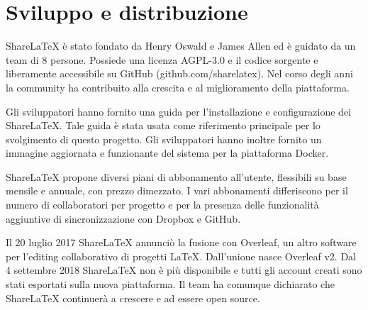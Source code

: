 \section{Sviluppo e distribuzione}
ShareLaTeX è stato fondato da Henry Oswald e James Allen ed è guidato da un team di 8 persone. Possiede una licenza AGPL-3.0 e il codice sorgente e liberamente accessibile su GitHub (github.com/sharelatex). Nel corso degli anni la community ha contribuito alla crescita e al miglioramento della piattaforma.

Gli sviluppatori hanno fornito una guida per l'installazione e configurazione dei ShareLaTeX. Tale guida è stata usata come riferimento principale per lo svolgimento di questo progetto. Gli sviluppatori hanno inoltre fornito un immagine aggiornata e funzionante del sistema per la piattaforma Docker.

ShareLaTeX propone diversi piani di abbonamento all'utente, flessibili su base mensile e annuale, con prezzo dimezzato. I vari abbonamenti differiscono per il numero di collaboratori per progetto e per la presenza delle funzionalità aggiuntive di sincronizzazione con Dropbox e GitHub.

Il 20 luglio 2017 ShareLaTeX annunciò la fusione con Overleaf, un altro software per l'editing collaborativo di progetti LaTeX. Dall'unione nasce Overleaf v2. Dal 4 settembre 2018 ShareLaTeX non è più disponibile e tutti gli account creati sono stati esportati sulla nuova piattaforma.
Il team ha comunque dichiarato che ShareLaTeX continuerà a crescere e ad essere open source.